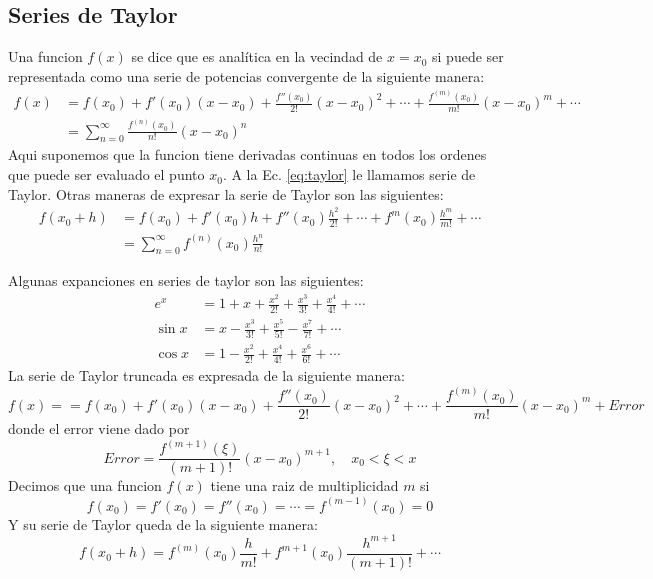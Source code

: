 \documentclass{article}
\begin{document}
\subsection{Series de Taylor}
Una funcion $f(x)$ se dice que es anal\'itica en la vecindad de
$x=x_0$ si puede ser representada como una serie de potencias
convergente de la siguiente manera:
\begin{equation}\label{eq:taylor}
\begin{split}
f(x)&=f(x_0)+f'(x_0)(x-x_0) + \frac{f''(x_0)}{2!}(x-x_0)^2+\cdots +
\frac{f^{(m)}(x_0)}{m!}(x-x_0)^m + \cdots \\
 &=\sum_{n=0}^{\infty}\frac{f^{(n)}(x_0)}{n!}(x-x_0)^n
\end{split}
\end{equation}
Aqui suponemos que la funcion tiene derivadas continuas en todos los
ordenes que puede ser evaluado el punto $x_0$. A la
Ec. \ref{eq:taylor} le llamamos serie de Taylor. Otras maneras de
expresar la serie de Taylor son las siguientes:
\begin{equation}
\begin{split}
f(x_0+h) &= f(x_0) + f'(x_0)h + f''(x_0)\frac{h^2}{2!}+ \cdots +
f^{m}(x_0)\frac{h^m}{m!} + \cdots \\
  &=\sum_{n=0}^{\infty}f^{(n)}(x_0)\frac{h^n}{n!}
\end{split}
\end{equation}

Algunas expanciones en series de taylor son las siguientes:
\begin{equation}
\begin{split}
e^x &=1+x+\frac{x^2}{2!} + \frac{x^3}{3!} + \frac{x^4}{4!} +\cdots\\
\sin x &=x - \frac{x^3}{3!}+ \frac{x^5}{5!} - \frac{x^7}{7!} + \cdots\\
\cos x &=1-\frac{x^2}{2!} + \frac{x^4}{4!} + \frac{x^6}{6!} + \cdots
\end{split}\nonumber
\end{equation}
La serie de Taylor truncada es expresada de la siguiente manera:
\begin{equation}
f(x) = =f(x_0)+f'(x_0)(x-x_0) + \frac{f''(x_0)}{2!}(x-x_0)^2+\cdots +
\frac{f^{(m)}(x_0)}{m!}(x-x_0)^m + Error
\end{equation}
donde el error viene dado por
\begin{equation}
Error = \frac{f^{(m+1)}(\xi)}{(m+1)!}(x-x_0)^{m+1},\quad x_0<\xi<x
\end{equation}
Decimos que una funcion $f(x)$ tiene una raiz de multiplicidad $m$ si
\begin{equation}
f(x_0)=f'(x_0)=f''(x_0)=\cdots = f^{(m-1)}(x_0)=0
\end{equation}
Y su serie de Taylor queda de la siguiente manera:
\begin{equation}
f(x_0+h)=f^{(m)}(x_0)\frac{h}{m!}+f^{m+1}(x_0)\frac{h^{m+1}}{(m+1)!}+\cdots
\end{equation}
\end{document}
